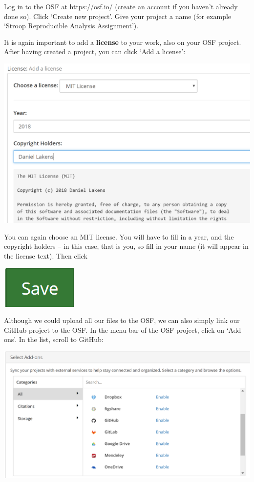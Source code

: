\documentclass[
  oneside]{krantz}
\begin{document}
Log in to the OSF at \url{https://osf.io/} (create an account if you haven't already done so). Click `Create new project'. Give your project a name (for example `Stroop Reproducible Analysis Assignment').

It is again important to add a \textbf{license} to your work, also on your OSF project. After having created a project, you can click `Add a license':

\begin{center}\includegraphics[width=1\linewidth]{images/372c6ba890617ecf396d540bed85698c} \end{center}

You can again choose an MIT license. You will have to fill in a year, and the copyright holders -- in this case, that is you, so fill in your name (it will appear in the license text). Then click

\begin{center}\includegraphics[width=0.2\linewidth]{images/e137b9bdf5f301150dc3c06b6f3eb5ca} \end{center}

Although we could upload all our files to the OSF, we can also simply link our
GitHub project to the OSF. In the menu bar of the OSF project, click on
`Add-ons'. In the list, scroll to GitHub:

\begin{center}\includegraphics[width=1\linewidth]{images/e25382896d7b290ad6649a6f2d5c13a2} \end{center}
\end{document}
